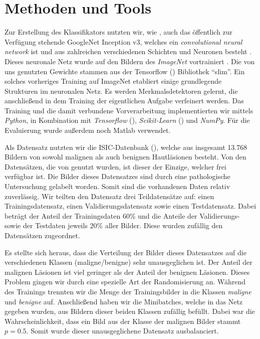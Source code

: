 \section{Methoden und Tools}

Zur Erstellung des Klassifikators nutzten wir, wie \citet{esteva2017dermatologist}, auch das öffentlich zur Verfügung stehende GoogleNet Inception v3, welches ein \textit{convolutional neural network} ist und aus zahlreichen verschiedenen Schichten und Neuronen besteht \citep{szegedy2016rethinking}. Dieses neuronale Netz wurde auf den Bildern des \textit{ImageNet} vortrainiert \citep{russakovsky2015imagenet}. Die von uns genutzten Gewichte stammen aus der Tensorflow (\cite{tensorflow2015-whitepaper}) Bibliothek ``slim''.
Ein solches vorheriges Training auf ImageNet etabliert einige grundlegende Strukturen im neuronalen Netz. Es werden Merkmalsdetektoren gelernt, die anschließend in dem Training der eigentlichen Aufgabe verfeinert werden.  Das Training und die damit verbundene Vorverarbeitung implementierten wir mittels \textit{Python}, in Kombination mit \textit{Tensorflow} (\cite{tensorflow2015-whitepaper}), \textit{Scikit-Learn} (\cite{scikit-learn}) und \textit{NumPy}. Für die Evaluierung wurde außerdem noch Matlab verwendet.

Als Datensatz nutzten wir die ISIC-Datenbank (\cite{ISIC}), welche aus insgesamt 13.768 Bildern von sowohl malignen als auch benignen Hautläsionen besteht. Von den Datensätzen, die von \citet{esteva2017dermatologist} genutzt wurden, ist dieser der Einzige, welcher frei verfügbar ist. Die Bilder dieses Datensatzes sind durch eine pathologische Untersuchung gelabelt worden. Somit sind die vorhandenen Daten relativ zuverlässig. Wir teilten den Datensatz drei Teildatensätze auf: einen Trainingsdatensatz, einen Validierungsdatensatz sowie einen Testdatensatz. Dabei beträgt der Anteil der Trainingsdaten $60\%$ und die Anteile der Validierungs- sowie der Testdaten jeweils $20\%$ aller Bilder. Diese wurden zufällig den Datensätzen zugeordnet.

Es stellte sich heraus, dass die Verteilung der Bilder dieses Datensatzes auf die verschiedenen Klassen (maligne/benigne) sehr unausgeglichen ist. Der Anteil der malignen Läsionen ist viel geringer als der Anteil der benignen Läsionen. Dieses Problem gingen wir durch eine spezielle Art der Randomisierung an. Während des Trainings trennten wir die Menge der Trainingsbilder in die Klassen \textit{maligne} und \textit{benigne} auf. Anschließend haben wir die Minibatches, welche in das Netz gegeben wurden, aus Bildern dieser beiden Klassen zufällig befüllt. Dabei war die Wahrscheinlichkeit, dass ein Bild aus der Klasse der malignen Bilder stammt $p=0.5$. Somit wurde dieser unausgeglichene Datensatz ausbalanciert.

